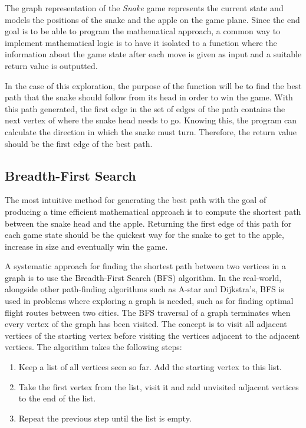 \documentclass[12pt]{article}
\begin{document}
The graph representation of the \textit{Snake} game represents the current state and models the positions of the snake and the apple on the game plane. Since the end goal is to be able to program the mathematical approach, a common way to implement mathematical logic is to have it isolated to a function where the information about the game state after each move is given as input and a suitable return value is outputted.

In the case of this exploration, the purpose of the function will be to find the best path that the snake should follow from its head in order to win the game. With this path generated, the first edge in the set of edges of the path contains the next vertex of where the snake head needs to go. Knowing this, the program can calculate the direction in which the snake must turn. Therefore, the return value should be the first edge of the best path.

\subsection{Breadth-First Search}

The most intuitive method for generating the best path with the goal of producing a time efficient mathematical approach is to compute the shortest path between the snake head and the apple. Returning the first edge of this path for each game state should be the quickest way for the snake to get to the apple, increase in size and eventually win the game.

A systematic approach for finding the shortest path between two vertices in a graph is to use the Breadth-First Search (BFS) algorithm. In the real-world, alongside other path-finding algorithms such as A-star and Dijkstra's, BFS is used in problems where exploring a graph is needed, such as for finding optimal flight routes between two cities. The BFS traversal of a graph terminates when every vertex of the graph has been visited. The concept is to visit all adjacent vertices of the starting vertex before visiting the vertices adjacent to the adjacent vertices. The algorithm takes the following steps:

\begin{enumerate}
	\item Keep a list of all vertices seen so far. Add the starting vertex to this list.
	\item Take the first vertex from the list, visit it and add unvisited adjacent vertices to the end of the list.
	\item Repeat the previous step until the list is empty.
\end{enumerate}
\end{document}
